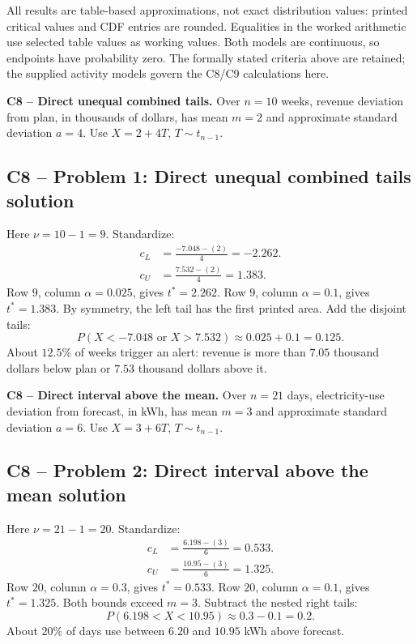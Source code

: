 All results are table-based approximations, not exact distribution values: printed critical values and CDF entries are rounded.
Equalities in the worked arithmetic use selected table values as working values.
Both models are continuous, so endpoints have probability zero.
The formally stated criteria above are retained; the supplied activity models govern the C8/C9 calculations here.


{
\textbf{C8 -- Direct unequal combined tails.} Over $n=10$ weeks, revenue deviation from plan, in thousands of dollars, has mean $m=2$ and approximate standard deviation $a=4$. Use $X=2+4T$, $T\sim t_{n-1}$.
\label{sol:q1}
\subsection*{C8 -- Problem 1: Direct unequal combined tails solution }
Here $\nu=10-1=9$. Standardize:
\[
\begin{aligned}
c_L&=\frac{-7.048-(2)}{4}=-2.262.\\
c_U&=\frac{7.532-(2)}{4}=1.383.
\end{aligned}
\]
Row $9$, column $\alpha=0.025$, gives $t^*=2.262$. Row $9$, column $\alpha=0.1$, gives $t^*=1.383$. 
By symmetry, the left tail has the first printed area. Add the disjoint tails:
\[
P(X<-7.048\text{ or }X>7.532)\approx0.025+0.1=\boxed{0.125}.
\]
About $12.5\%$ of weeks trigger an alert: revenue is more than $7.05$ thousand dollars below plan or $7.53$ thousand dollars above it.
\secInicio[][sec:q1]
}

{
\textbf{C8 -- Direct interval above the mean.} Over $n=21$ days, electricity-use deviation from forecast, in kWh, has mean $m=3$ and approximate standard deviation $a=6$. Use $X=3+6T$, $T\sim t_{n-1}$.
\label{sol:q2}
\subsection*{C8 -- Problem 2: Direct interval above the mean solution }
Here $\nu=21-1=20$. Standardize:
\[
\begin{aligned}
c_L&=\frac{6.198-(3)}{6}=0.533.\\
c_U&=\frac{10.95-(3)}{6}=1.325.
\end{aligned}
\]
Row $20$, column $\alpha=0.3$, gives $t^*=0.533$. Row $20$, column $\alpha=0.1$, gives $t^*=1.325$. 
Both bounds exceed $m=3$. Subtract the nested right tails:
\[
P(6.198<X<10.95)\approx0.3-0.1=\boxed{0.2}.
\]
About $20\%$ of days use between $6.20$ and $10.95$ kWh above forecast.
\secInicio[][sec:q2]
}

